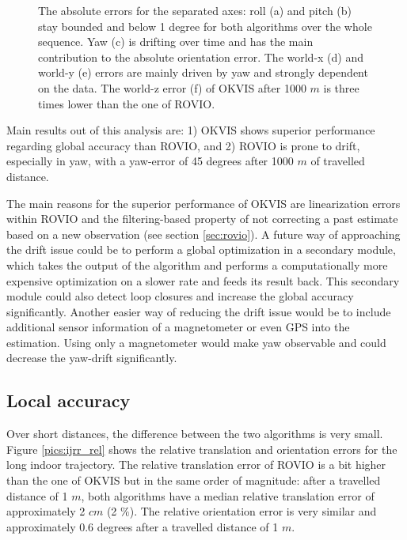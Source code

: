 \begin{figure}[h]
\begin{subfigure}[b]{0.48\textwidth}
    \caption{}
  \end{subfigure}
   \caption{The absolute errors for the separated axes: roll (a) and pitch (b) stay bounded and below 1 degree for both algorithms over the whole sequence. Yaw (c) is drifting over time and has the main contribution to the absolute orientation error. The world-x (d) and world-y (e) errors are mainly driven by yaw and strongly dependent on the data. The world-z error (f) of OKVIS after 1000 $m$ is three times lower than the one of ROVIO.}
   \label{pics:ijrr_abs_separate}
\end{figure}

Main results out of this analysis are: 1) OKVIS shows superior performance regarding global accuracy than ROVIO, and 2) ROVIO is prone to drift, especially in yaw, with a yaw-error of 45 degrees after 1000 $m$ of travelled distance.

The main reasons for the superior performance of OKVIS are linearization errors within ROVIO and the filtering-based property of not correcting a past estimate based on a new observation (see section \ref{sec:rovio}). 
A future way of approaching the drift issue could be to perform a global optimization in a secondary module, which takes the output of the algorithm and performs a computationally more expensive optimization on a slower rate and feeds its result back. This secondary module could also detect loop closures and increase the global accuracy significantly. Another easier way of reducing the drift issue would be to include additional sensor information of a magnetometer or even GPS into the estimation. Using only a magnetometer would make yaw observable and could decrease the yaw-drift significantly.


\subsection{Local accuracy}
\label{sec:ijrr_local}

Over short distances, the difference between the two algorithms is very small. Figure \ref{pics:ijrr_rel} shows the relative translation and orientation errors for the long indoor trajectory. The relative translation error of ROVIO is a bit higher than the one of OKVIS but in the same order of magnitude: after a travelled distance of 1 $m$, both algorithms have a median relative translation error of approximately 2 $cm$ (2 $\%$). The relative orientation error is very similar and approximately 0.6 degrees after a travelled distance of 1 $m$. \\

